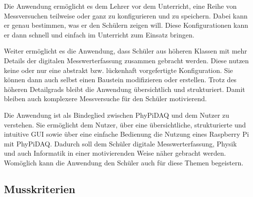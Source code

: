 \documentclass[parskip=full]{scrartcl}
\begin{document}
Die Anwendung ermöglicht es dem Lehrer vor dem Unterricht, eine Reihe von Messversuchen teilweise oder ganz zu konfigurieren und zu speichern. Dabei kann er genau bestimmen, was er den Schülern zeigen will. Diese Konfigurationen kann er dann schnell und einfach im Unterricht zum Einsatz bringen. 

Weiter ermöglicht es die Anwendung, dass Schüler aus höheren Klassen mit mehr Details der digitalen Messwerterfassung zusammen gebracht werden. Diese nutzen keine oder nur eine abstrakt bzw. lückenhaft vorgefertigte Konfiguration. Sie können dann auch selbst einen Baustein modifizieren oder erstellen. Trotz des höheren Detailgrads bleibt die Anwendung übersichtlich und strukturiert. Damit bleiben auch komplexere Messversuche für den Schüler motivierend. 

Die Anwendung ist als Bindeglied zwischen PhyPiDAQ und dem Nutzer zu verstehen. Sie ermöglicht dem Nutzer, über eine übersichtliche, strukturierte und intuitive GUI sowie über eine einfache Bedienung die Nutzung eines Raspberry Pi mit PhyPiDAQ. Dadurch soll dem Schüler digitale Messwerterfassung, Physik und auch Informatik in einer motivierenden Weise näher gebracht werden. Womöglich kann die Anwendung den Schüler auch für diese Themen begeistern.  

\subsection{Musskriterien}
\end{document}

